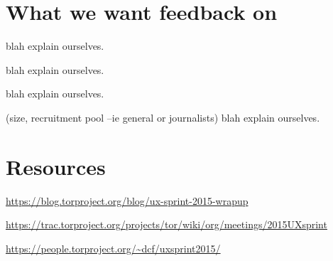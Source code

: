 \documentclass{sig-alternate-hotpets15}
\begin{document}
\section{What we want feedback on}

 blah explain ourselves. 

 blah explain ourselves. 

 blah explain ourselves. 

 (size, recruitment pool --ie general or journalists) blah explain ourselves. 

\section{Resources}

\url{https://blog.torproject.org/blog/ux-sprint-2015-wrapup}

\url{https://trac.torproject.org/projects/tor/wiki/org/meetings/2015UXsprint}

\url{https://people.torproject.org/~dcf/uxsprint2015/}


 
\end{document}
